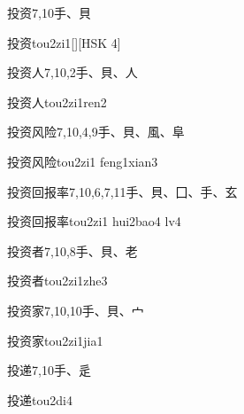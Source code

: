 \begin{Entry}{投资}{7,10}{⼿、⾙}
  \begin{Phonetics}{投资}{tou2zi1}[][HSK 4]
  \end{Phonetics}
\end{Entry}

\begin{Entry}{投资人}{7,10,2}{⼿、⾙、⼈}
  \begin{Phonetics}{投资人}{tou2zi1ren2}
  \end{Phonetics}
\end{Entry}

\begin{Entry}{投资风险}{7,10,4,9}{⼿、⾙、⾵、⾩}
  \begin{Phonetics}{投资风险}{tou2zi1 feng1xian3}
  \end{Phonetics}
\end{Entry}

\begin{Entry}{投资回报率}{7,10,6,7,11}{⼿、⾙、⼞、⼿、⽞}
  \begin{Phonetics}{投资回报率}{tou2zi1 hui2bao4 lv4}
  \end{Phonetics}
\end{Entry}

\begin{Entry}{投资者}{7,10,8}{⼿、⾙、⽼}
  \begin{Phonetics}{投资者}{tou2zi1zhe3}
  \end{Phonetics}
\end{Entry}

\begin{Entry}{投资家}{7,10,10}{⼿、⾙、⼧}
  \begin{Phonetics}{投资家}{tou2zi1jia1}
  \end{Phonetics}
\end{Entry}

\begin{Entry}{投递}{7,10}{⼿、⾡}
  \begin{Phonetics}{投递}{tou2di4}
  \end{Phonetics}
\end{Entry}

